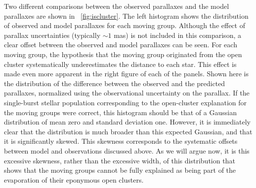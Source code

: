 Two different comparisons between the observed parallaxes and the
model parallaxes are shown in \figurename~\ref{fig:iscluster}. The
left histogram shows the distribution of observed and model parallaxes
for each moving group. Although the effect of parallax uncertainties
(typically $\sim\!1$ mas) is not included in this comparison, a clear
offset between the observed and model parallaxes can be seen. For each
moving group, the hypothesis that the moving group originated from the
open cluster systematically underestimates the distance to each
star. This effect is made even more apparent in the right figure of
each of the panels. Shown here is the distribution of the difference
between the observed and the predicted parallaxes, normalized using
the observational uncertainty on the parallax. If the single-burst
stellar population corresponding to the open-cluster explanation for
the moving groups were correct, this histogram should be that of a
Gaussian distribution of mean zero and standard deviation
one. However, it is immediately clear that the distribution is much
broader than this expected Gaussian, and that it is significantly
skewed. This skewness corresponds to the systematic offsets between
model and observations discussed above. As we will argue now, it is
this excessive skewness, rather than the excessive width, of this
distribution that shows that the moving groups cannot be fully
explained as being part of the evaporation of their eponymous open
clusters.

